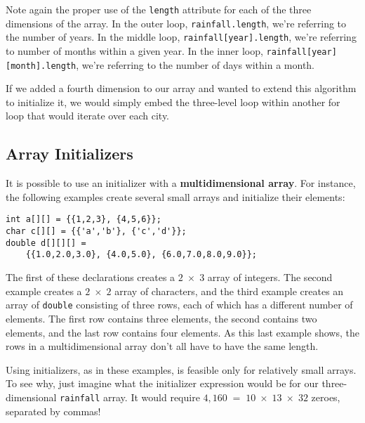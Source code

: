 \noindent Note again the proper use of the {\tt length}
attribute for each of the three dimensions of the array.   In the outer
loop, {\tt rainfall.length}, we're referring to the number of
years.  In the middle loop, {\tt rainfall[year].length}, we're
referring to number of months within a given year.  In the inner loop,
{\tt rainfall[year][month].length}, we're referring to the number of
days within a month.

If we added a fourth dimension to our array and wanted to extend this
algorithm to initialize it, we would simply embed the three-level loop
within another for loop that would iterate over each city.

\subsection{Array Initializers}
\noindent It is possible to use an initializer with a
{\bf multidimensional array}.  For instance, the
following examples create several small arrays and initialize their
elements:

\begin{jjjlisting}
\begin{lstlisting}
int a[][] = {{1,2,3}, {4,5,6}};
char c[][] = {{'a','b'}, {'c','d'}};
double d[][][] = 
    {{1.0,2.0,3.0}, {4.0,5.0}, {6.0,7.0,8.0,9.0}};
\end{lstlisting}
\end{jjjlisting}

\noindent The first of these declarations creates a $2\; \times \;3$ array of
integers.   The second example creates a $2\; \times\; 2$ array of
characters, and the third example creates an array of {\tt double}
consisting of three rows, each of which has a different number of
elements.   The first row contains three elements, the second contains two
elements, and the last row contains four elements.  As this last example
shows, the rows in a multidimensional array don't all have to have the
same length.  

Using initializers, as in these examples, is feasible only for
relatively small arrays.  To see why, just imagine what the initializer
expression would be for our three-dimensional {\tt rainfall} array.  It
would require $4,160 \;=\; 10 \; \times \; 13 \; \times \; 32$ zeroes,
separated by commas!


